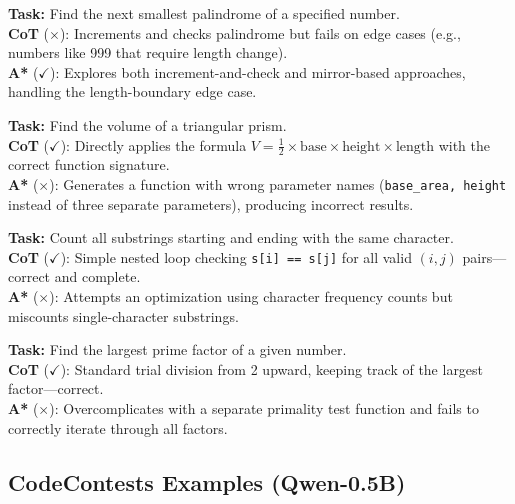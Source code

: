 \documentclass[10pt]{article}
\begin{document}
{\begin{examplebox}[title=MBPP/100 --- A* Correct{,} CoT Wrong]
\textbf{Task:} Find the next smallest palindrome of a specified number.\\[4pt]
\textbf{CoT} ($\times$): Increments and checks palindrome but fails on edge cases (e.g., numbers like 999 that require length change).\\[4pt]
\textbf{A*} ($\checkmark$): Explores both increment-and-check and mirror-based approaches, handling the length-boundary edge case.
\end{examplebox}

\begin{examplebox}[title=MBPP/14 --- CoT Correct{,} A* Wrong]
\textbf{Task:} Find the volume of a triangular prism.\\[4pt]
\textbf{CoT} ($\checkmark$): Directly applies the formula $V = \frac{1}{2} \times \text{base} \times \text{height} \times \text{length}$ with the correct function signature.\\[4pt]
\textbf{A*} ($\times$): Generates a function with wrong parameter names (\texttt{base\_area, height} instead of three separate parameters), producing incorrect results.
\end{examplebox}

\begin{examplebox}[title=MBPP/30 --- CoT Correct{,} A* Wrong]
\textbf{Task:} Count all substrings starting and ending with the same character.\\[4pt]
\textbf{CoT} ($\checkmark$): Simple nested loop checking \texttt{s[i] == s[j]} for all valid $(i,j)$ pairs---correct and complete.\\[4pt]
\textbf{A*} ($\times$): Attempts an optimization using character frequency counts but miscounts single-character substrings.
\end{examplebox}

\begin{examplebox}[title=MBPP/32 --- CoT Correct{,} A* Wrong]
\textbf{Task:} Find the largest prime factor of a given number.\\[4pt]
\textbf{CoT} ($\checkmark$): Standard trial division from 2 upward, keeping track of the largest factor---correct.\\[4pt]
\textbf{A*} ($\times$): Overcomplicates with a separate primality test function and fails to correctly iterate through all factors.
\end{examplebox}

\subsection{CodeContests Examples (Qwen-0.5B)}

}
\end{document}
